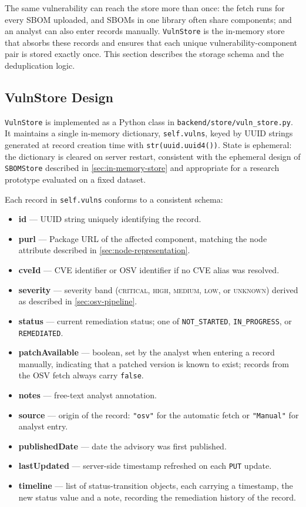 The same vulnerability can reach the store more than once: the fetch runs for every SBOM uploaded, and SBOMs in one library often share components; and an analyst can also enter records manually. \texttt{VulnStore} is the in-memory store that absorbs these records and ensures that each unique vulnerability-component pair is stored exactly once. This section describes the storage schema and the deduplication logic.


\subsection{VulnStore Design}
\label{sec:vulnstore-design}

\texttt{VulnStore} is implemented as a Python class in \texttt{backend/store/vuln\_store.py}. It maintains a single in-memory dictionary, \texttt{self.vulns}, keyed by UUID strings generated at record creation time with \texttt{str(uuid.uuid4())}. State is ephemeral: the dictionary is cleared on server restart, consistent with the ephemeral design of \texttt{SBOMStore} described in \autoref{sec:in-memory-store} and appropriate for a research prototype evaluated on a fixed dataset.

Each record in \texttt{self.vulns} conforms to a consistent schema:

\begin{itemize}
    \item \textbf{id} --- UUID string uniquely identifying the record.
    \item \textbf{purl} --- Package URL of the affected component, matching the node attribute described in \autoref{sec:node-representation}.
    \item \textbf{cveId} --- CVE identifier or OSV identifier if no CVE alias was resolved.
    \item \textbf{severity} --- severity band (\textsc{critical}, \textsc{high}, \textsc{medium}, \textsc{low}, or \textsc{unknown}) derived as described in \autoref{sec:osv-pipeline}.
    \item \textbf{status} --- current remediation status; one of \texttt{NOT\_STARTED}, \texttt{IN\_PROGRESS}, or \texttt{REMEDIATED}.
    \item \textbf{patchAvailable} --- boolean, set by the analyst when entering a record manually, indicating that a patched version is known to exist; records from the OSV fetch always carry \texttt{false}.
    \item \textbf{notes} --- free-text analyst annotation.
    \item \textbf{source} --- origin of the record: \texttt{"osv"} for the automatic fetch or \texttt{"Manual"} for analyst entry.
    \item \textbf{publishedDate} --- date the advisory was first published.
    \item \textbf{lastUpdated} --- server-side timestamp refreshed on each \texttt{PUT} update.
    \item \textbf{timeline} --- list of status-transition objects, each carrying a timestamp, the new status value and a note, recording the remediation history of the record.
\end{itemize}


